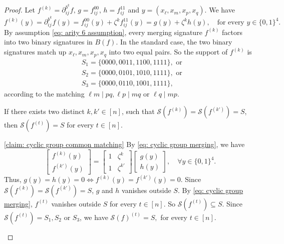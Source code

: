 \begin{proof}
    Let $f^{(k)}=\partial_{ij}^{b^k}f,\, g=f_{ij}^{00},\,h=f_{ij}^{11}$ and $y=(x_\ell,x_m,x_p,x_q).$
    We have 
    \begin{equation}\label{eq: cyclic group merging}
        f^{(k)}(y)=\partial_{ij}^{b^{k}}f(y)=f_{ij}^{00}(y)+\zeta^k f_{ij}^{11}(y)=g(y)+\zeta^k h(y), \quad \text{for every } y\in \{0,1\}^4.
    \end{equation}
    By assumption \eqref{eq: arity 6 assumption}, every merging signature $f^{(k)}$ factors into two binary signatures in $B(f).$
    In the standard case, the two binary signatures match up $x_\ell,x_m,x_p,x_q$ into two equal pairs.
    So the support of $f^{(k)}$ is
    \begin{equation*}
        \begin{aligned}
            &S_1=\{0000,0011,1100,1111\}, \text{ or }\\
            &S_2=\{0000,0101,1010,1111\}, \text{ or }\\
    &S_3=\{0000,0110,1001,1111\},
        \end{aligned}
    \end{equation*}
    according to the matching $\ell m\mid pq, \ell p\mid mq$ or $\ell q\mid mp.$
    \begin{claim}\label{claim: cyclic group common matching}
        If there exists two distinct $k,k'\in [n]$, such that $\mathscr{S}(f^{(k)})=\mathscr{S}(f^{(k')})=S$, then $\mathscr{S}(f^{(t)})=S$ for every $t\in[n]$. 
    \end{claim}
    \begin{claimproof}{\cref{claim: cyclic group common matching}}
    By \eqref{eq: cyclic group merging}, we have
    \[\left[
    \begin{matrix}
        f^{(k)}(y)\\
        f^{(k')}(y)
    \end{matrix}
    \right]
    =\left[\begin{matrix}
        1 & \zeta^k\\
        1 & \zeta^{k'}
    \end{matrix}
    \right]
    \left[\begin{matrix}
        g(y)\\
        h(y)
    \end{matrix}
    \right],\quad \forall y\in \{0,1\}^4.
    \]
    Thus, $g(y)=h(y)=0 \iff f^{(k)}(y)=f^{(k')}(y)=0.$
    Since $\mathscr{S}(f^{(k)})=\mathscr{S}(f^{(k')})=S$, $g$ and $h$ vanishes outside $S$.
    By \eqref{eq: cyclic group merging}, $f^{(t)}$ vanishes outside $S$ for every $t\in [n]$.
    So $\mathscr{S}(f^{(t)})\subseteq S.$
    Since $\mathscr{S}(f^{(t)})=S_1,S_2$ or $S_3$, we have $\mathscr{S}(f)^{(t)}=S,$ for every $t\in [n].$
    \end{claimproof}
    

\end{proof}
